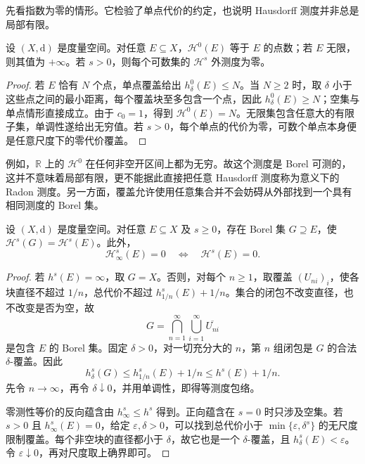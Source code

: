先看指数为零的情形。它检验了单点代价的约定，也说明 Hausdorff 测度并非总是局部有限。

\begin{proposition}
\label{b1:prop:hausdorff-counting}
设 \((X,\mathrm d)\) 是度量空间。对任意 \(E\subseteq X\)，\(\mathcal H^0(E)\) 等于 \(E\) 的点数；若 \(E\) 无限，则其值为 \(+\infty\)。若 \(s>0\)，则每个可数集的 \(\mathcal H^s\) 外测度为零。
\end{proposition}
\begin{proof}
若 \(E\) 恰有 \(N\) 个点，单点覆盖给出 \(h^0_\delta(E)\leq N\)。当 \(N\geq2\) 时，取 \(\delta\) 小于这些点之间的最小距离，每个覆盖块至多包含一个点，因此 \(h^0_\delta(E)\geq N\)；空集与单点情形直接成立。由于 \(c_0=1\)，得到 \(\mathcal H^0(E)=N\)。无限集包含任意大的有限子集，单调性遂给出无穷值。若 \(s>0\)，每个单点的代价为零，可数个单点本身便是任意尺度下的零代价覆盖。
\end{proof}

例如，\(\mathbb R\) 上的 \(\mathcal H^0\) 在任何非空开区间上都为无穷。故这个测度是 Borel 可测的，这并不意味着局部有限，更不能据此直接把任意 Hausdorff 测度称为意义下的 Radon 测度。另一方面，覆盖允许使用任意集合并不会妨碍从外部找到一个具有相同测度的 Borel 集。

\begin{proposition}
\label{b1:prop:hausdorff-borel-hull}
设 \((X,\mathrm d)\) 是度量空间。对任意 \(E\subseteq X\) 及 \(s\geq0\)，存在 Borel 集 \(G\supseteq E\)，使 \(\mathcal H^s(G)=\mathcal H^s(E)\)。此外，
\[
\mathcal H^s_\infty(E)=0
\quad\Longleftrightarrow\quad
\mathcal H^s(E)=0.
\]
\end{proposition}
\begin{proof}
若 \(h^s(E)=\infty\)，取 \(G=X\)。否则，对每个 \(n\geq1\)，取覆盖 \((U_{ni})_i\)，使各块直径不超过 \(1/n\)，总代价不超过 \(h^s_{1/n}(E)+1/n\)。集合的闭包不改变直径，也不改变是否为空，故
\[
G=\bigcap_{n=1}^{\infty}\bigcup_{i=1}^{\infty}\overline{U_{ni}}
\]
是包含 \(E\) 的 Borel 集。固定 \(\delta>0\)，对一切充分大的 \(n\)，第 \(n\) 组闭包是 \(G\) 的合法 \(\delta\)-覆盖。因此
\[
h^s_\delta(G)\leq h^s_{1/n}(E)+1/n\leq h^s(E)+1/n.
\]
先令 \(n\to\infty\)，再令 \(\delta\downarrow0\)，并用单调性，即得等测度包络。

零测性等价的反向蕴含由 \(h^s_\infty\leq h^s\) 得到。正向蕴含在 \(s=0\) 时只涉及空集。若 \(s>0\) 且 \(h^s_\infty(E)=0\)，给定 \(\varepsilon,\delta>0\)，可以找到总代价小于 \(\min\{\varepsilon,\delta^s\}\) 的无尺度限制覆盖。每个非空块的直径都小于 \(\delta\)，故它也是一个 \(\delta\)-覆盖，且 \(h^s_\delta(E)<\varepsilon\)。令 \(\varepsilon\downarrow0\)，再对尺度取上确界即可。
\end{proof}

